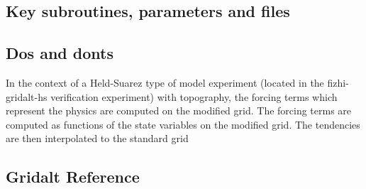 \subsection {Key subroutines, parameters and files } 

\subsection {Dos and donts}

In the context of a Held-Suarez type of model experiment (located
in the fizhi-gridalt-hs verification experiment) with
topography, the forcing terms which represent the physics are computed on 
the modified grid. The forcing terms are computed as functions of the
state variables on the modified grid. The tendencies are then interpolated
to the standard grid

\subsection {Gridalt Reference} 
